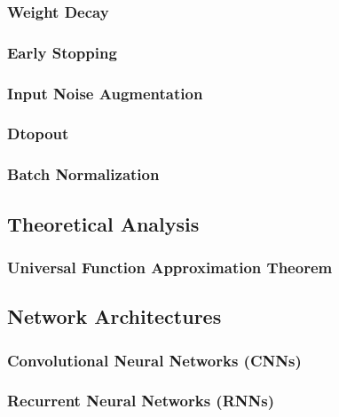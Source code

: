			\subsubsection{Weight Decay} %

			\subsubsection{Early Stopping} %

			\subsubsection{Input Noise Augmentation} %

			\subsubsection{Dtopout} %

			\subsubsection{Batch Normalization} %

		\subsection{Theoretical Analysis} %

			\subsubsection{Universal Function Approximation Theorem} %

		\subsection{Network Architectures} %

			\subsubsection{Convolutional Neural Networks (CNNs)} %

			\subsubsection{Recurrent Neural Networks (RNNs)} %

